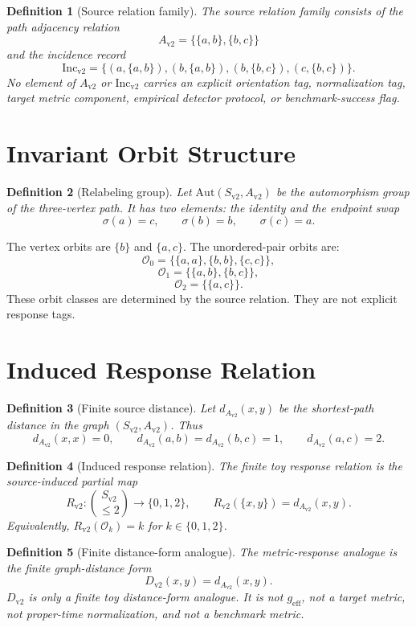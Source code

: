 \documentclass[11pt]{article}
\newtheorem{definition}{Definition}
\newcommand{\Sv}{S_{\mathrm{v2}}}
\newcommand{\Av}{A_{\mathrm{v2}}}
\newcommand{\Incv}{\mathrm{Inc}_{\mathrm{v2}}}
\newcommand{\Aut}{\mathrm{Aut}}
\newcommand{\Rv}{R_{\mathrm{v2}}}
\newcommand{\Dv}{D_{\mathrm{v2}}}
\newcommand{\GEff}{g_{\mathrm{eff}}}
\begin{document}
\begin{definition}[Source relation family]
The source relation family consists of the path adjacency relation
\[
  \Av=\{\{a,b\},\{b,c\}\}
\]
and the incidence record
\[
  \Incv=\{(a,\{a,b\}),(b,\{a,b\}),(b,\{b,c\}),(c,\{b,c\})\}.
\]
No element of \(\Av\) or \(\Incv\) carries an explicit orientation tag,
normalization tag, target metric component, empirical detector protocol, or
benchmark-success flag.
\end{definition}

\section{Invariant Orbit Structure}

\begin{definition}[Relabeling group]
Let \(\Aut(\Sv,\Av)\) be the automorphism group of the three-vertex path.
It has two elements: the identity and the endpoint swap
\[
  \sigma(a)=c,\qquad \sigma(b)=b,\qquad \sigma(c)=a.
\]
\end{definition}

The vertex orbits are \(\{b\}\) and \(\{a,c\}\). The unordered-pair orbits
are:
\[
  \mathcal{O}_0=\{\{a,a\},\{b,b\},\{c,c\}\},
\]
\[
  \mathcal{O}_1=\{\{a,b\},\{b,c\}\},
\]
\[
  \mathcal{O}_2=\{\{a,c\}\}.
\]
These orbit classes are determined by the source relation. They are not
explicit response tags.

\section{Induced Response Relation}

\begin{definition}[Finite source distance]
Let \(d_{\Av}(x,y)\) be the shortest-path distance in the graph
\((\Sv,\Av)\). Thus
\[
  d_{\Av}(x,x)=0,\qquad
  d_{\Av}(a,b)=d_{\Av}(b,c)=1,\qquad
  d_{\Av}(a,c)=2.
\]
\end{definition}

\begin{definition}[Induced response relation]
The finite toy response relation is the source-induced partial map
\[
  \Rv:\binom{\Sv}{\leq 2}\to\{0,1,2\},\qquad
  \Rv(\{x,y\})=d_{\Av}(x,y).
\]
Equivalently, \(\Rv(\mathcal{O}_k)=k\) for \(k\in\{0,1,2\}\).
\end{definition}

\begin{definition}[Finite distance-form analogue]
The metric-response analogue is the finite graph-distance form
\[
  \Dv(x,y)=d_{\Av}(x,y).
\]
\(\Dv\) is only a finite toy distance-form analogue. It is not
\(\GEff\), not a target metric, not proper-time normalization, and not a
benchmark metric.
\end{definition}
\end{document}
